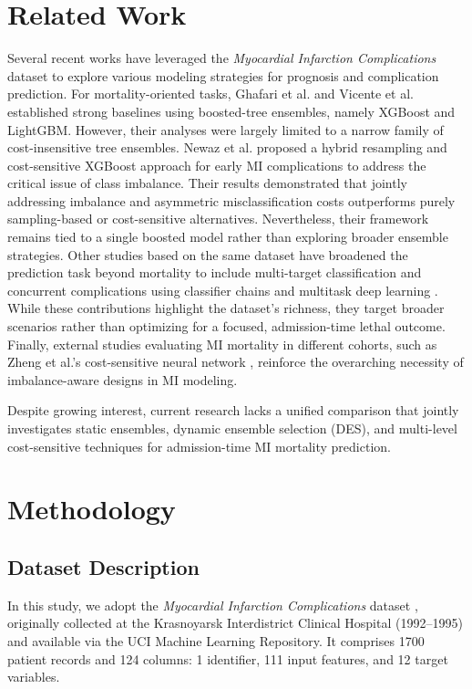 \documentclass[conference]{IEEEtran}
\begin{document}
\section{Related Work} \label{sec:related-works}
Several recent works have leveraged the \textit{Myocardial Infarction Complications} dataset to explore various modeling strategies for prognosis and complication prediction. For mortality-oriented tasks, Ghafari et al. \cite{ghafari2023prediction} and Vicente et al. \cite{vicente2024explainablelightgbmapproachpredicting} established strong baselines using boosted-tree ensembles, namely XGBoost and LightGBM. However, their analyses were largely limited to a narrow family of cost-insensitive tree ensembles. Newaz et al. \cite{NEWAZ2023101361} proposed a hybrid resampling and cost-sensitive XGBoost approach for early MI complications to address the critical issue of class imbalance. Their results demonstrated that jointly addressing imbalance and asymmetric misclassification costs outperforms purely sampling-based or cost-sensitive alternatives. Nevertheless, their framework remains tied to a single boosted model rather than exploring broader ensemble strategies. Other studies based on the same dataset have broadened the prediction task beyond mortality to include multi-target classification and concurrent complications using classifier chains and multitask deep learning \cite{Baidya2024, Elashmawi2024, Makhmudov2025}. While these contributions highlight the dataset's richness, they target broader scenarios rather than optimizing for a focused, admission-time lethal outcome. Finally, external studies evaluating MI mortality in different cohorts, such as Zheng et al.'s cost-sensitive neural network \cite{zheng2024cost}, reinforce the overarching necessity of imbalance-aware designs in MI modeling.

Despite growing interest, current research lacks a unified comparison that jointly investigates static ensembles, dynamic ensemble selection (DES), and multi-level cost-sensitive techniques for admission-time MI mortality prediction.

\section{Methodology} \label{sec:methodology}
\subsection{Dataset Description}
In this study, we adopt the \textit{Myocardial Infarction Complications} dataset \cite{golovenkin2020myocardial}, originally collected at the Krasnoyarsk Interdistrict Clinical Hospital (1992--1995) and available via the UCI Machine Learning Repository. It comprises 1700 patient records and 124 columns: 1 identifier, 111 input features, and 12 target variables.
\end{document}
